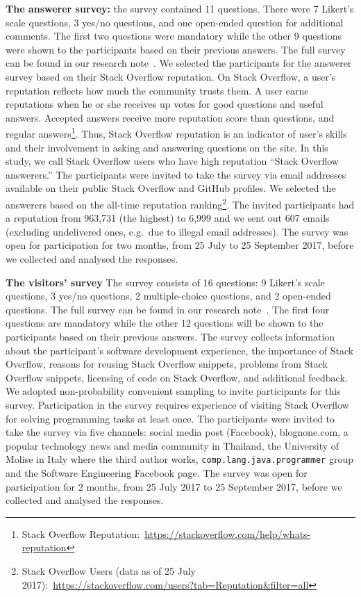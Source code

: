 \documentclass[10pt,journal,compsoc]{IEEEtran}
\begin{document}
\textbf{The answerer survey:} the survey contained
11 questions. There were 7 Likert's scale questions, 3 yes/no questions, and one
open-ended question for additional comments. The first two questions were
mandatory while the other 9 questions were shown to the participants based on
their previous answers. The full survey can be found in our research note~\cite{Ragkhitwetsagul_RN2017}.
We selected the participants for the answerer survey based on their Stack Overflow
reputation. On Stack Overflow, a user's reputation reflects how much the
community trusts them. A user earns reputations when he or she receives up votes
for good questions and useful answers. Accepted answers receive more reputation
score than questions, and regular answers\footnote{Stack Overflow
	Reputation:~\url{https://stackoverflow.com/help/whats-reputation}}. Thus, Stack
Overflow reputation is an indicator of user's skills and their involvement in
asking and answering questions on the site. In this study, we call Stack
Overflow users who have high reputation ``Stack Overflow answerers.''
The participants were invited to take the survey via email addresses available
on their public Stack Overflow and GitHub profiles. We selected the answerers
based on the all-time reputation ranking\footnote{Stack Overflow Users (data as
	of 25 July 2017):~\url{https://stackoverflow.com/users?tab=Reputation&filter=all}}. The
invited participants had a reputation from 963,731 (the highest) to 6,999 and
we sent out 607 emails (excluding undelivered ones, e.g.\ due to
illegal email addresses). 
The survey was
open for participation for two months, from 25 July to 25 September 2017, before
we collected and analysed the responses.

\textbf{The visitors' survey}
The survey consists of 16 questions: 9 Likert's
scale questions, 3 yes/no questions, 2 multiple-choice questions, and 2
open-ended questions. 
The full survey can be found in our research note~\cite{Ragkhitwetsagul_RN2017}.
The first four questions are mandatory while the other 12
questions will be shown to the participants based on their previous answers. 
The survey collects information about the participant's software development
experience, the importance of Stack Overflow, reasons for reusing Stack Overflow
snippets, problems from Stack Overflow snippets, licensing of code on Stack
Overflow, and additional feedback. 
We adopted non-probability convenient sampling to invite participants for this
survey. Participation in the survey requires experience of visiting Stack
Overflow for solving programming tasks at least once. The participants were
invited to take the survey via five channels: social media post (Facebook),
\textsf{blognone.com}, a popular technology news and media community in Thailand, the University of Molise in Italy where the third author
works, \texttt{comp.lang.java.programmer} group and the Software Engineering
Facebook page. 
The survey was open for participation for 2 months, 
from 25 July 2017 to 25 September 2017, before we collected and analysed
the responses.
\end{document}
